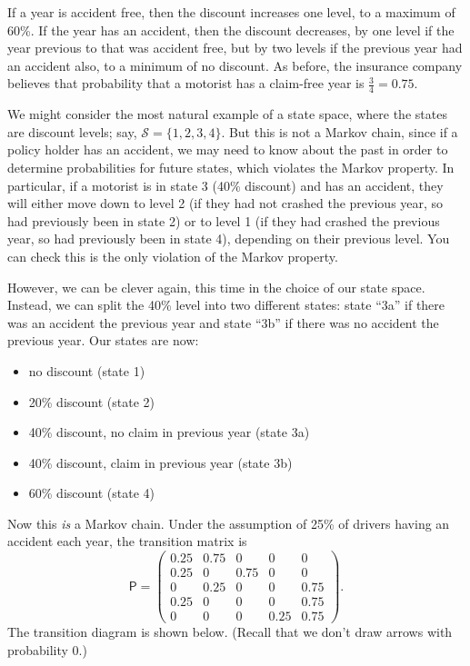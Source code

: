 \documentclass[
  a4paper,
]{article}
\providecommand{\tightlist}{%
  \setlength{\itemsep}{0pt}\setlength{\parskip}{0pt}}
\theoremstyle{definition}
\theoremstyle{definition}
\theoremstyle{definition}
\theoremstyle{remark}
\begin{document}
If a year is accident free, then the discount increases one level, to a maximum of 60\%. If the year has an accident, then the discount decreases, by one level if the year previous to that was accident free, but by two levels if the previous year had an accident also, to a minimum of no discount.
As before, the insurance company believes that probability that a motorist has a claim-free year is \(\frac34 = 0.75\).

We might consider the most natural example of a state space, where the states are discount levels; say, \(\mathcal{S}=\{1,2,3,4\}\). But this is not a Markov chain, since if a policy holder has an accident, we may need to know about the past in order to determine probabilities for future states, which violates the Markov property. In particular, if a motorist is in state 3 (40\% discount) and has an accident, they will either move down to level 2 (if they had not crashed the previous year, so had previously been in state 2) or to level 1 (if they had crashed the previous year, so had previously been in state 4), depending on their previous level. You can check this is the only violation of the Markov property.

However, we can be clever again, this time in the choice of our state space. Instead, we can split the 40\% level into two different states: state ``3a'' if there was an accident the previous year and state ``3b'' if there was no accident the previous year. Our states are now:

\begin{itemize}
\tightlist
\item
  no discount (state 1)
\item
  20\% discount (state 2)
\item
  40\% discount, no claim in previous year (state 3a)
\item
  40\% discount, claim in previous year (state 3b)
\item
  60\% discount (state 4)
\end{itemize}

Now this \emph{is} a Markov chain. Under the assumption of 25\% of drivers having an accident each year, the transition matrix is
\[
\mathsf P=\begin{pmatrix}
0.25 & 0.75 & 0 & 0 & 0\\
0.25 & 0 & 0.75 & 0 & 0\\
0 & 0.25 & 0 & 0 & 0.75\\
0.25 & 0 & 0 & 0 & 0.75\\
0 & 0 & 0 & 0.25 & 0.75\end{pmatrix}.
\]
The transition diagram is shown below. (Recall that we don't draw arrows with probability 0.)
\end{document}
